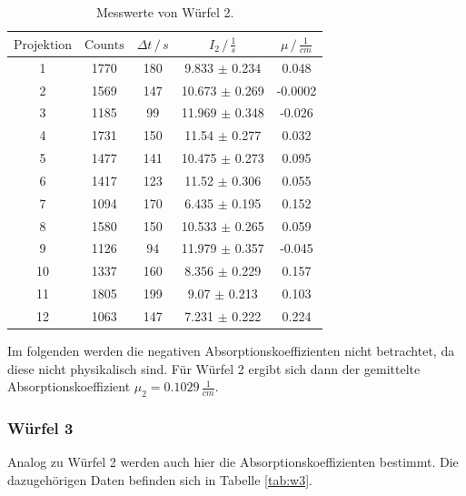 \begin{table}
  \centering
  \label{tab:w2}
  \begin{tabular}{c c c c c}
  \toprule
  $\text{Projektion}$ & $\text{Counts}$ & $\Delta t \,/\, s $ & $I_2 \,/\, \frac{1}{s} $ & $\mu \,/\, \frac{1}{cm}$\\
  \midrule 
 1 & 1770 & 180 & 9.833 $\pm$ 0.234  & 0.048 \\
 2 & 1569 & 147 & 10.673 $\pm$ 0.269 & -0.0002 \\
 3 & 1185 & 99 & 11.969 $\pm$ 0.348  & -0.026 \\
 4 & 1731 & 150 & 11.54 $\pm$ 0.277  & 0.032 \\
 5 & 1477 & 141 & 10.475 $\pm$ 0.273 & 0.095 \\
 6 & 1417 & 123 & 11.52 $\pm$ 0.306  & 0.055 \\
 7 & 1094 & 170 & 6.435 $\pm$ 0.195  & 0.152 \\
 8 & 1580 & 150 & 10.533 $\pm$ 0.265 & 0.059 \\
 9 & 1126 & 94 & 11.979 $\pm$ 0.357  & -0.045 \\
10 & 1337 & 160 & 8.356 $\pm$ 0.229  & 0.157 \\
11 & 1805 & 199 & 9.07 $\pm$ 0.213   &  0.103 \\
12 & 1063 & 147 & 7.231 $\pm$ 0.222  & 0.224 \\
\bottomrule
\end{tabular}
\label{tab:w2}
\caption{Messwerte von Würfel 2.}
\end{table}

\noindent
Im folgenden werden die negativen Absorptionskoeffizienten nicht betrachtet, da diese nicht physikalisch sind.
Für Würfel 2 ergibt sich dann der gemittelte Absorptionskoeffizient $\mu_2 = 0.1029 \, \frac{1}{cm}$.

  
  
\subsubsection{Würfel 3}

\noindent
Analog zu Würfel 2 werden auch hier die Absorptionskoeffizienten bestimmt.
Die dazugehörigen Daten befinden sich in Tabelle \ref{tab:w3}.

